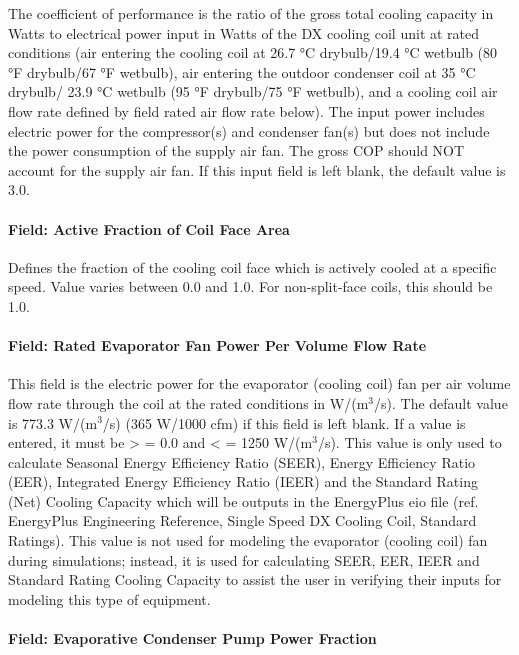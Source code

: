 The coefficient of performance is the ratio of the gross total cooling capacity in Watts to electrical power input in Watts of the DX cooling coil unit at rated conditions (air entering the cooling coil at 26.7 °C drybulb/19.4 °C wetbulb (80 °F drybulb/67 °F wetbulb), air entering the outdoor condenser coil at 35 °C drybulb/ 23.9 °C wetbulb (95 °F drybulb/75 °F wetbulb), and a cooling coil air flow rate defined by field rated air flow rate below). The input power includes electric power for the compressor(s) and condenser fan(s) but does not include the power consumption of the supply air fan. The gross COP should NOT account for the supply air fan. If this input field is left blank, the default value is 3.0.

\paragraph{Field: Active Fraction of Coil Face Area}\label{field-active-fraction-of-coil-face-area}

Defines the fraction of the cooling coil face which is actively cooled at a specific speed. Value varies between 0.0 and 1.0. For non-split-face coils, this should be 1.0.

\paragraph{Field: Rated Evaporator Fan Power Per Volume Flow Rate}\label{field-rated-evaporator-fan-power-per-volume-flow-rate}

This field is the electric power for the evaporator (cooling coil) fan per air volume flow rate through the coil at the rated conditions in W/(m\(^{3}\)/s). The default value is 773.3 W/(m\(^{3}\)/s) (365 W/1000 cfm) if this field is left blank. If a value is entered, it must be \textgreater{} = 0.0 and \textless{} = 1250 W/(m\(^{3}\)/s). This value is only used to calculate Seasonal Energy Efficiency Ratio (SEER), Energy Efficiency Ratio (EER), Integrated Energy Efficiency Ratio (IEER) and the Standard Rating (Net) Cooling Capacity which will be outputs in the EnergyPlus eio file (ref. EnergyPlus Engineering Reference, Single Speed DX Cooling Coil, Standard Ratings). This value is not used for modeling the evaporator (cooling coil) fan during simulations; instead, it is used for calculating SEER, EER, IEER and Standard Rating Cooling Capacity to assist the user in verifying their inputs for modeling this type of equipment.

\paragraph{Field: Evaporative Condenser Pump Power Fraction}\label{field-evaporative-condenser-pump-power-fraction}

